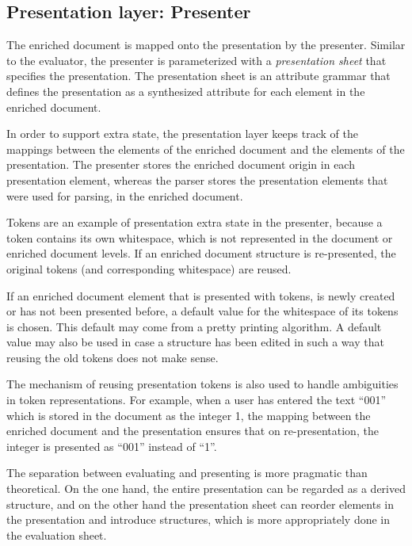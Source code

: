 %																
\subsection{Presentation layer: Presenter} \label{sect:presenter}

The enriched document is mapped onto the presentation by the presenter. Similar to the evaluator, the presenter is parameterized with a {\em presentation sheet} that specifies the presentation. The presentation sheet is an attribute grammar that defines the presentation as a synthesized attribute for each element in the enriched document. 

In order to support extra state, the presentation layer keeps track of the mappings between the elements of the enriched document and the elements of the presentation. The presenter stores the enriched document origin in each presentation element, whereas the parser stores the presentation elements that were used for parsing, in the enriched document.

Tokens are an example of presentation extra state in the presenter, because a token contains its own whitespace, which is not represented in the document or enriched document levels. If an enriched document structure is re-presented, the original tokens (and corresponding white\-space) are reused. 

If an enriched document element that is presented with tokens, is newly created or has not been presented before, a default value for the whitespace of its tokens is chosen. This default may come from a pretty printing algorithm. A default value may also be used in case a structure has been edited in such a way that reusing the old tokens does not make sense.

The mechanism of reusing presentation tokens is also used to handle ambiguities in token representations. For example, when a user has entered the text ``001'' which is stored in the document as the integer 1, the mapping between the enriched document and the presentation ensures that on re-presentation, the integer is presented as ``001'' instead of ``1''.

The separation between evaluating and presenting is more pragmatic than theoretical. On the one hand, the entire presentation can be regarded as a derived structure, and on the other hand the presentation sheet can reorder elements in the presentation and introduce structures, which is more appropriately done in the evaluation sheet. 

